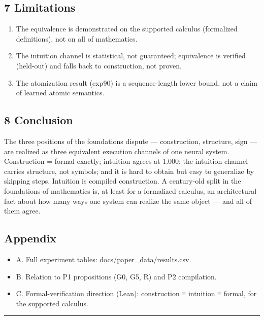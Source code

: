\documentclass[
]{article}
\providecommand{\tightlist}{%
  \setlength{\itemsep}{0pt}\setlength{\parskip}{0pt}}
\begin{document}
\subsection{7 Limitations}\label{limitations}

\begin{enumerate}
\def\labelenumi{\arabic{enumi}.}
\tightlist
\item
  The equivalence is demonstrated on the supported calculus (formalized
  definitions), not on all of mathematics.
\item
  The intuition channel is statistical, not guaranteed; equivalence is
  verified (held-out) and falls back to construction, not proven.
\item
  The atomization result (exp90) is a sequence-length lower bound, not a
  claim of learned atomic semantics.
\end{enumerate}

\subsection{8 Conclusion}\label{conclusion}

The three positions of the foundations dispute --- construction,
structure, sign --- are realized as three equivalent execution channels
of one neural system. Construction = formal exactly; intuition agrees at
1.000; the intuition channel carries structure, not symbols; and it is
hard to obtain but easy to generalize by skipping steps. Intuition is
compiled construction. A century-old split in the foundations of
mathematics is, at least for a formalized calculus, an architectural
fact about how many ways one system can realize the same object --- and
all of them agree.

\subsection{Appendix}\label{appendix}

\begin{itemize}
\tightlist
\item
  A. Full experiment tables: docs/paper\_data/results.csv.
\item
  B. Relation to P1 propositions (G0, G5, R) and P2 compilation.
\item
  C. Formal-verification direction (Lean): construction ≡ intuition ≡
  formal, for the supported calculus.
\end{itemize}

\begin{center}\rule{0.5\linewidth}{0.5pt}\end{center}
\end{document}
